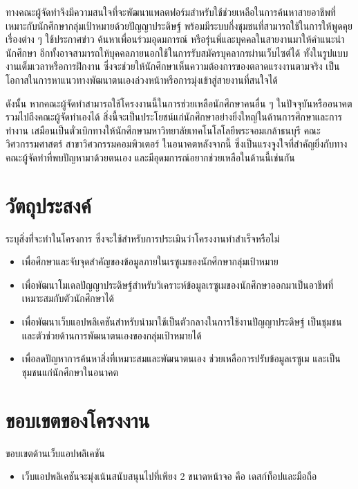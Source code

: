 ทางคณะผู้จัดทำจึงมีความสนใจที่จะพัฒนาแพลตฟอร์มสำหรับใช้ช่วยเหลือในการค้นหาสายอาชีพที่เหมาะกับนักศึกษากลุ่มเป้าหมายด้วยปัญญาประดิษฐ์ พร้อมมีระบบกึ่งชุมชนที่สามารถใช้ในการให้พูดคุยเรื่องต่าง ๆ ใช้ประกาศข่าว ค้นหาเพื่อนร่วมอุดมการณ์ หรือรุ่นพี่และบุคคลในสายงานมาให้คำแนะนำนักศึกษา อีกทั้งอาจสามารถให้บุคคลภายนอกใช้ในการรับสมัครบุคลากรผ่านเว็บไซต์ได้ ทั้งในรูปแบบงานเต็มเวลาหรือการฝึกงาน ซึ่งจะช่วยให้นักศึกษาเห็นความต้องการของตลาดแรงงานตามจริง เป็นโอกาสในการหาแนวทางพัฒนาตนเองล่วงหน้าหรือการมุ่งเข้าสู่สายงานที่สนใจได้

ดังนั้น  หากคณะผู้จัดทำสามารถใช้โครงงานนี้ในการช่วยเหลือนักศึกษาคนอื่น ๆ ในปัจจุบันหรืออนาคต รวมไปถึงคณะผู้จัดทำเองได้ สิ่งนี้จะเป็นประโยชน์แก่นักศึกษาอย่างยิ่งใหญ่ในด้านการศึกษาและการทำงาน เสมือนเป็นตั๋วเบิกทางให้นักศึกษามหาวิทยาลัยเทคโนโลโลยีพระจอมเกล้าธนบุรี คณะวิศวกรรมศาสตร์ สาขาวิศวกรรมคอมพิวเตอร์ ในอนาคตหลังจากนี้ ซึ่งเป็นแรงจูงใจที่สำคัญยิ่งกับทางคณะผู้จัดทำที่พบปัญหามาด้วยตนเอง และมีอุดมการณ์อยากช่วยเหลือในด้านนี้เช่นกัน


\section{วัตถุประสงค์}

ระบุสิ่งท่ี่จะทำในโครงการ ซึ่งจะใช้สำหรับการประเมินว่าโครงงานทำสำเร็จหรือไม่

\begin{itemize}
    \item  เพื่อศึกษาและจับจุดสำคัญของข้อมูลภายในเรซูเมของนักศึกษากลุ่มเป้าหมาย
    \item  เพื่อพัฒนาโมเดลปัญญาประดิษฐ์สำหรับวิเคราะห์ข้อมูลเรซูเมของนักศึกษาออกมาเป็นอาชีพที่เหมาะสมกับตัวนักศึกษาได้
    \item  เพื่อพัฒนาเว็บแอปพลิเคชันสำหรับนำมาใช้เป็นตัวกลางในการใช้งานปัญญาประดิษฐ์ เป็นชุมชนและตัวช่วยด้านการพัฒนาตนเองของกลุ่มเป้าหมายได้
    \item  เพื่อลดปัญหาการค้นหาสิ่งที่เหมาะสมและพัฒนาตนเอง ช่วยเหลือการปรับข้อมูลเรซูเม และเป็นชุมชนแก่นักศึกษาในอนาคต
\end{itemize}


\section{ขอบเขตของโครงงาน}

ขอบเขตด้านเว็บแอปพลิเคชัน
\begin{itemize}
    \item  เว็บแอปพลิเคชันจะมุ่งเน้นสนับสนุนไปที่เพียง 2 ขนาดหน้าจอ คือ เดสก์ท็อปและมือถือ
\end{itemize}

